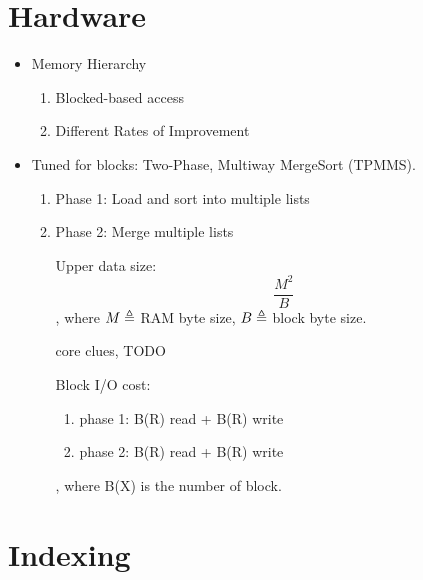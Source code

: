 \documentclass{article}
\begin{document}
\section{Hardware}
\begin{itemize}
\item Memory Hierarchy 
\begin{enumerate}
\item Blocked-based access 
\item Different Rates of Improvement 
\end{enumerate}
\item Tuned for blocks: Two-Phase, Multiway MergeSort (TPMMS). 
\begin{enumerate}
\item Phase 1: Load and sort into multiple lists 
\item Phase 2: Merge multiple lists 

Upper data size: 
$$
\frac{M^2}{B}
$$
, where $M\triangleq$ RAM byte size, $B\triangleq$ block byte size. 

core clues, TODO

Block I/O cost:
\begin{enumerate}
\item phase 1: B(R) read + B(R) write 
\item phase 2: B(R) read + B(R) write 
\end{enumerate}
, where B(X) is the number of block. 
\end{enumerate}
\end{itemize}


\section{Indexing}
\end{document}

